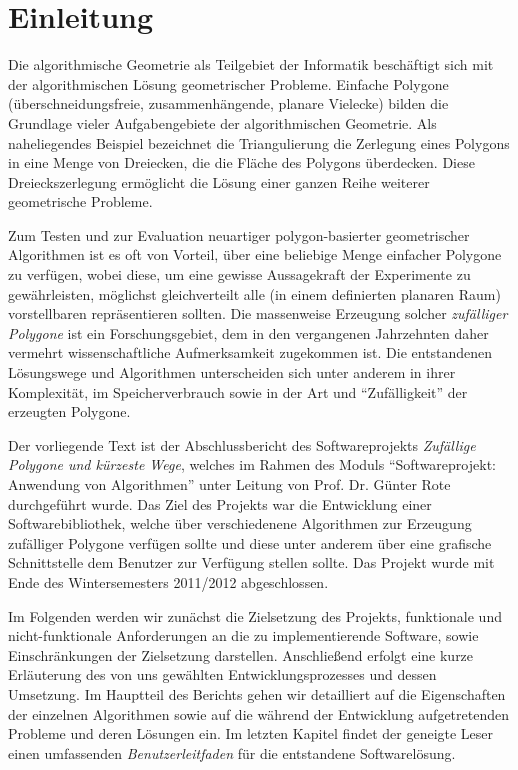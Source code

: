 \section{Einleitung}
Die algorithmische Geometrie als Teilgebiet der Informatik beschäftigt sich mit der algorithmischen Lösung geometrischer Probleme. Einfache Polygone (überschneidungsfreie, zusammenhängende, planare Vielecke) bilden die Grundlage vieler Aufgabengebiete der algorithmischen Geometrie. Als naheliegendes Beispiel bezeichnet die Triangulierung die Zerlegung eines Polygons in eine Menge von Dreiecken, die die Fläche des Polygons überdecken. Diese Dreieckszerlegung ermöglicht die Lösung einer ganzen Reihe weiterer geometrische Probleme.

Zum Testen und zur Evaluation neuartiger polygon-basierter geometrischer Algorithmen ist es oft von Vorteil, über eine beliebige Menge einfacher Polygone zu verfügen, wobei diese, um eine gewisse Aussagekraft der Experimente zu gewährleisten, möglichst gleichverteilt alle (in einem definierten planaren Raum) vorstellbaren repräsentieren sollten. Die massenweise Erzeugung solcher \emph{zufälliger Polygone} ist ein Forschungsgebiet, dem in den vergangenen Jahrzehnten daher vermehrt wissenschaftliche Aufmerksamkeit zugekommen ist. Die entstandenen Lösungswege und Algorithmen unterscheiden sich unter anderem in ihrer Komplexität, im Speicherverbrauch sowie in der Art und \enquote{Zufälligkeit} der erzeugten Polygone.

Der vorliegende Text ist der Abschlussbericht des Softwareprojekts \emph{Zufällige Polygone und kürzeste Wege}, welches im Rahmen des Moduls \enquote{Softwareprojekt: Anwendung von Algorithmen} unter Leitung von Prof. Dr. Günter Rote durchgeführt wurde. Das Ziel des Projekts war die Entwicklung einer Softwarebibliothek, welche über verschiedenene Algorithmen zur Erzeugung zufälliger Polygone verfügen sollte und diese unter anderem über eine grafische Schnittstelle dem Benutzer zur Verfügung stellen sollte. Das Projekt wurde mit Ende des Wintersemesters 2011/2012 abgeschlossen.

Im Folgenden werden wir zunächst die Zielsetzung des Projekts, funktionale und nicht-funktionale Anforderungen an die zu implementierende Software, sowie Einschränkungen der Zielsetzung darstellen. Anschließend erfolgt eine kurze Erläuterung des von uns gewählten Entwicklungsprozesses und dessen Umsetzung. Im Hauptteil des Berichts gehen wir detailliert auf die Eigenschaften der einzelnen Algorithmen sowie auf die während der Entwicklung aufgetretenden Probleme und deren Lösungen ein. Im letzten Kapitel findet der geneigte Leser einen umfassenden \emph{Benutzerleitfaden} für die entstandene Softwarelösung.
